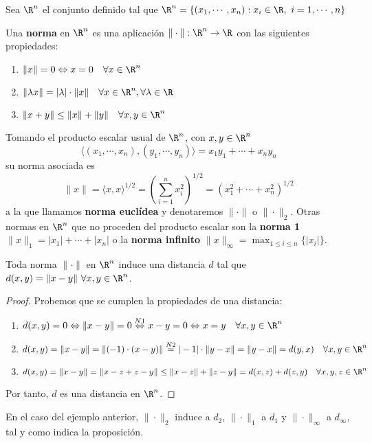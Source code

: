 Sea $\R^n$ el conjunto definido tal que $\R^n=\{(x_1,\cdots,x_n):x_i \in \R, \ i=1,\cdots,n\}$
\begin{ndef}[Norma]
  Una \textbf{norma} en $\R^n$ es una aplicación $\|\cdot\|: \R^n \to \R$ con las siguientes propiedades:
  \begin{enumerate}[label=N{{\arabic*}}]
    \item $\|x\|=0 \Leftrightarrow x=0 \quad \forall x \in \R^n$
    \item $\|\lambda x\|=|\lambda| \cdot \|x\|\quad \forall x \in \R^n, \forall \lambda \in \R$
    \item $\|x+y\| \le \|x\|+\|y\| \quad \forall x,y \in \R^n$
  \end{enumerate}
\end{ndef}
\begin{exmp}
  Tomando el producto escalar usual de $\R^n$, con $x,y \in \R^n$ \[\langle (x_1, \cdots, x_n), (y_1,\cdots,y_n)\rangle=x_1y_1+\cdots+x_ny_n\] su norma asociada es \[\|x\|=\langle x,x\rangle^{1/2}= \left(\sum^n_{i=1}x^2_i\right)^{1/2}=(x^2_1+\cdots+x^2_n)^{1/2}\]
  a la que llamamos \textbf{norma euclídea} y denotaremos $\|\cdot\|$ o $\|\cdot\|_2$. Otras normas en $\R^n$ que no proceden del producto escalar son la \textbf{norma 1} $\|x\|_1=|x_1|+\cdots+|x_n|$ o la \textbf{norma infinito} $\|x\|_\infty = \max_{1 \leq i \leq n} \{|x_i|\}$.
\end{exmp}

\begin{nprop}
  Toda norma $\|\cdot\|$ en $\R^n$ induce una distancia $d$ tal que $d(x,y)=\|x-y\| \ \forall x,y \in \R^n$.
\end{nprop}
\begin{proof} Probemos que se cumplen la propiedades de una distancia:
  \begin{enumerate}[label=D{{\arabic*}}]
    \item $d(x,y)=0 \Leftrightarrow \|x-y\|=0 \stackrel{N1}{\Leftrightarrow} x-y=0 \Leftrightarrow x=y \quad \forall x,y \in \R^n$
    \item $d(x,y)=\|x-y\|=\|(-1)\cdot(x-y)\|\stackrel{N2}{=} |-1|\cdot\|y-x\|=\|y-x\|=d(y,x) \quad \forall x,y \in \R^n$
    \item $d(x,y)=\|x-y\|=\|x-z+z-y\| \le \|x-z\|+\|z-y\|=d(x,z)+d(z,y) \quad \forall x,y,z \in \R^n$
  \end{enumerate}
  Por tanto, $d$ es una distancia en $\R^n$.
\end{proof}
\begin{exmp}
  En el caso del ejemplo anterior, $\|\cdot\|_2$ induce a $d_2$, $\|\cdot\|_1$ a $d_1$ y $\|\cdot\|_\infty$ a $d_\infty$, tal y como indica la proposición.
\end{exmp}

